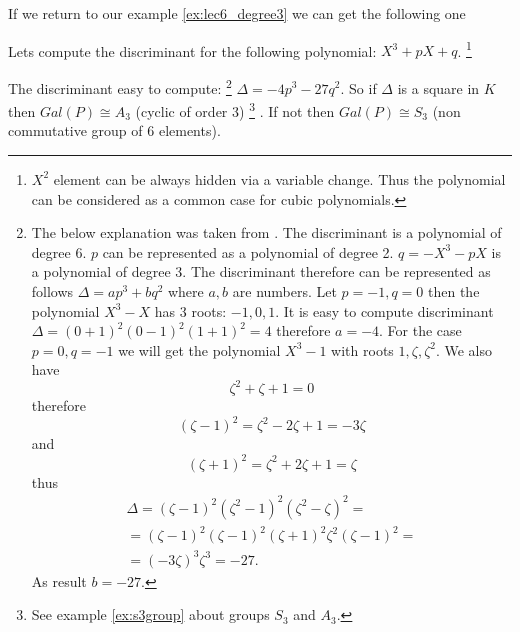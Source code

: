 If we return to our example \ref{ex:lec6_degree3} we can get the
following one
\begin{example}
  Lets compute the discriminant for the following polynomial:
  $X^3 + p X + q$.
  \footnote {
    $X^2$ element can be always hidden via a variable change. Thus the
    polynomial can be considered as a common case for cubic polynomials.
  }

  The discriminant easy to compute:
  \footnote{
    The below explanation was taken from
    \cite{mathstackexchange:discriminant3}. 
    The discriminant is a polynomial of degree 6. $p$ can be
    represented as a polynomial of degree 2. $q = - X^3 - p X$ is a
    polynomial of degree 3. The discriminant therefore can be
    represented as follows $\Delta = a p^3 + b q^2$ where $a,b$ are
    numbers. Let $p = -1, q = 0$ then the polynomial $X^3 - X$ has 3
    roots: $-1, 0, 1$. It is easy to compute discriminant
    $\Delta = (0 + 1)^2(0 - 1)^2(1+1)^2 = 4$ therefore $a =  -4$.
    For the case $p = 0, q = -1$ we will get the polynomial $X^3 - 1$
    with roots $1, \zeta, \zeta^2$. We also have
    \[
    \zeta^2 + \zeta + 1 = 0
    \]
    therefore
    \[
    \left(\zeta - 1\right)^2 = \zeta^2 - 2 \zeta + 1 = - 3 \zeta
    \]
    and
    \[
    \left(\zeta + 1\right)^2 = \zeta^2 + 2 \zeta + 1 =  \zeta
    \]    
    thus
    \begin{eqnarray}
    \Delta = \left(\zeta - 1\right)^2\left(\zeta^2 -
    1\right)^2\left(\zeta^2 - \zeta\right)^2 =
    \nonumber \\
    = \left(\zeta - 1\right)^2 \left(\zeta - 1\right)^2
    \left(\zeta + 1\right)^2 \zeta^2 \left(\zeta - 1\right)^2 =
    \nonumber \\
    = \left(- 3 \zeta\right)^3 \zeta^3 = -27.
    \nonumber
    \end{eqnarray}
    As result $b=-27$.
  }
  \(
  \Delta = -4 p^3 - 27 q^2
  \).
  So if $\Delta$ is a square in $K$ then $Gal\left(P\right) \cong A_3$
  (cyclic of order 3)
  \footnote{
    See example \ref{ex:s3group} about groups $S_3$ and
     $A_3$.
  }
  . If not then $Gal\left(P\right) \cong S_3$ (non
  commutative group of 6 elements).


\end{example}
